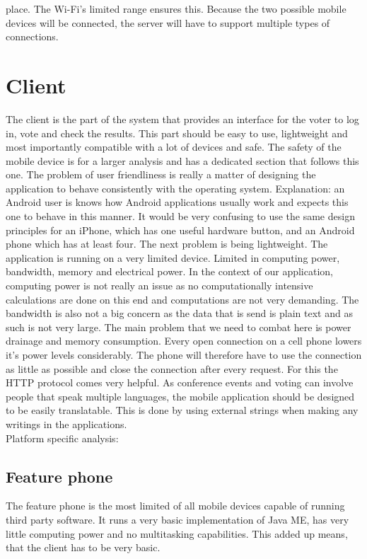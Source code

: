 \documentclass[11pt,twoside,a4paper]{book}
\begin{document}
place. The Wi-Fi's limited range ensures this. Because the two possible mobile devices will be connected, the server will have to support multiple types of connections.

\section{Client}
The client is the part of the system that provides an interface for the voter to log in, vote and check the results. This part should be easy to use, lightweight and most importantly compatible with a lot of devices and safe. The safety of the mobile device is for a larger analysis and has a dedicated section that follows this one. The problem of user friendliness is really a matter of designing the application to behave consistently with the operating system. Explanation: an Android user is knows how Android applications usually work and expects this one to behave in this manner. It would be very confusing to use the same design principles for an iPhone, which has one useful hardware button, and an Android phone which has at least four. The next problem is being lightweight. The application is running on a very limited device. Limited in computing power, bandwidth, memory and electrical power. In the context of our application, computing power is not really an issue as no computationally intensive calculations are done on this end and computations are not very demanding. The bandwidth is also not a big concern as the data that is send is plain text and as such is not very large. The main problem that we need to combat here is power drainage and memory consumption. Every open connection on a cell phone lowers it's power levels considerably. The phone will therefore have to use the connection as little as possible and close the connection after every request. For this the HTTP protocol comes very helpful. As conference events and voting can involve people that speak multiple languages, the mobile application should be designed to be easily translatable. This is done by using external strings when making any writings in the applications.\\
Platform specific analysis:
\subsection{Feature phone}
The feature phone is the most limited of all mobile devices capable of running third party software. It runs a very basic implementation of Java ME, has very little computing power and no multitasking capabilities. This added up means, that the client has to be very basic.
\end{document}
